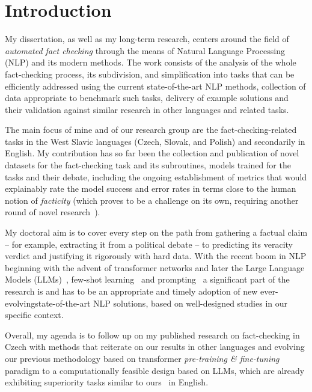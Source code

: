 
\chapter{Introduction}
\label{chap:intro}

My dissertation, as well as my long-term research, centers around the field of \textit{automated fact checking} through the means of Natural Language Processing (NLP) and its modern methods.
The work consists of the analysis of the whole fact-checking process, its subdivision, and simplification into tasks that can be efficiently addressed using the current state-of-the-art NLP methods, collection of data appropriate to benchmark such tasks, delivery of example solutions and their validation against similar research in other languages and related tasks.

The main focus of mine and of our research group are the fact-checking-related tasks in the West Slavic languages (Czech, Slovak, and Polish) and secondarily in English.
My contribution has so far been the collection and publication of novel datasets for the fact-checking task and its subroutines, models trained for the tasks and their debate, including the ongoing establishment of metrics that would explainably rate the model success and error rates in terms close to the human notion of \textit{facticity} (which proves to be a challenge on its own, requiring another round of novel research~\cite{ffci, wright}). 

My doctoral aim is to cover every step on the path from gathering a factual claim -- for example, extracting it from a political debate -- to predicting its veracity verdict and justifying it rigorously with hard data.
With the recent boom in NLP beginning with the advent of transformer networks and later the Large Language Models (LLMs)~\cite{llms}, few-shot learning~\cite{gpt3} and prompting~\cite{prompting} a significant part of the research is and has to be an appropriate and timely adoption of new ever-evolvingstate-of-the-art NLP solutions, based on well-designed studies in our specific context.

Overall, my agenda is to follow up on my published research on fact-checking in Czech with methods that reiterate on our results in other languages and evolving our previous methodology based on transformer \textit{pre-training \& fine-tuning} paradigm to a computationally feasible design based on LLMs, which are already exhibiting superiority tasks similar to ours~\cite{bing} in English.

